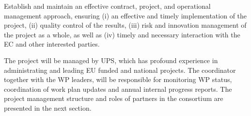 \begin{workpackage}[id=management,type=MGT,wphases=0-48!.2,swsites,
  title=Project Management,short=Management,
  lead=PS,
  PSRM=28,SARM=2,  
  USORM=2,LLRM=2,UVRM=2,UJFRM=2,UBRM=2,UORM=2, USHRM=2,
  UWRM=2, JURM=2, UKRM=2, USRM=2, ZHRM=1, SRRM=2]

\begin{wpobjectives}

Establish and maintain an effective contract, project, and operational management
approach, ensuring (i) an effective and timely implementation of the project, (ii) quality control
of the results, (iii) risk and innovation management of the project as a whole, as well as (iv)
timely and necessary interaction with the EC and other interested parties.

\end{wpobjectives}

\begin{wpdescription}
The project will be managed by UPS, which has profound experience in administrating and leading EU funded and national projects. The coordinator together with the WP leaders, will be responsible for monitoring WP status, coordination of work plan updates and annual internal progress reports. The project management structure  and roles of partners in the consortium are presented in the next section.
\end{wpdescription}


\end{workpackage}
